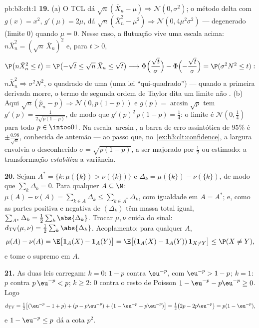 \begin{solution}{pb:b3:clt:1}
\textbf{19.} (a) O TCL dá $\sqrt n(\bar X_n - \mu)
\Rightarrow \mathcal N(0, \sigma^2)$; o método delta
com $g(x) = x^2$, $g'(\mu) = 2\mu$, dá $\sqrt n(\bar
X_n^2 - \mu^2) \Rightarrow \mathcal N(0, 4\mu^2\sigma^2)$
--- degenerado (limite $0$) quando $\mu = 0$. Nesse caso,
a flutuação vive uma escala acima: $n\bar X_n^2 =
(\sqrt n\,\bar X_n)^2$ e, para $t > 0$,
\[
\P\bigl(n\bar X_n^2 \leq t\bigr) = \P\bigl(-\sqrt t \leq
\sqrt n\,\bar X_n \leq \sqrt t\bigr) \longrightarrow
\Phi\Bigl(\frac{\sqrt t}\sigma\Bigr) -
\Phi\Bigl(-\frac{\sqrt t}\sigma\Bigr) = \P(\sigma^2N^2
\leq t) :
\]
$n\bar X_n^2 \Rightarrow \sigma^2N^2$, o quadrado de uma
 (uma lei ``qui-quadrado'') --- quando a primeira
derivada morre, o termo de segunda ordem de Taylor dita
um limite não . (b) Aqui $\sqrt n(\hat p_n - p)
\Rightarrow \mathcal N(0, p(1 - p))$ e $g(p) =
\arcsin\sqrt p$ tem $g'(p) = \frac1{2\sqrt{p(1 - p)}}$, de modo que
$g'(p)^2\,p(1 - p) = \frac14$: o limite é $\mathcal
N(0, \frac14)$ para todo $p \in \intoo01$. Na
escala $\arcsin$, a barra de erro assintótica de $95\%$ é $\pm
\frac{0.98}{\sqrt n}$, conhecida de antemão --- ao passo que, no~\cref{ex:b3:clt:confidence}, a largura envolvia o desconhecido
$\sigma = \sqrt{p(1-p)}$, a ser majorado por $\frac12$
ou estimado: a transformação \emph{estabiliza} a
variância.

\textbf{20.} Sejam $A^* = \{k : \mu(\{k\}) > \nu(\{k\})\}$
e $\Delta_k = \mu(\{k\}) - \nu(\{k\})$, de modo que
$\sum_k\Delta_k = 0$. Para qualquer $A \subseteq \N$: $\mu(A) -
\nu(A) = \sum_{k\in A}\Delta_k \leq \sum_{k\in
A^*}\Delta_k$, com igualdade em $A = A^*$; e, como as
partes positiva e negativa de $(\Delta_k)$ têm massa
total igual, $\sum_{A^*}\Delta_k =
\frac12\sum_k\abs{\Delta_k}$. Trocar $\mu, \nu$ cuida
do sinal: $d_{\mathrm{TV}}(\mu, \nu) =
\frac12\sum_k\abs{\Delta_k}$. Acoplamento: para qualquer $A$,
\[
\mu(A) - \nu(A) = \E\bigl[\mathbf 1_A(X) - \mathbf
1_A(Y)\bigr] = \E\bigl[(\mathbf 1_A(X) - \mathbf
1_A(Y))\,\mathbf 1_{X\neq Y}\bigr] \leq \P(X \neq Y),
\]
e tome o supremo em $A$.

\textbf{21.} As duas leis carregam: $k = 0$: $1 - p$ contra
$\eu^{-p}$, com $\eu^{-p} > 1 - p$; $k = 1$: $p$ contra
$p\,\eu^{-p} < p$; $k \geq 2$: $0$ contra o resto de Poisson
$1 - \eu^{-p} - p\eu^{-p} \geq 0$. Logo
\[
d_{\mathrm{TV}} = \tfrac12\bigl[(\eu^{-p} - 1 + p) + (p -
p\eu^{-p}) + (1 - \eu^{-p} - p\eu^{-p})\bigr] =
\tfrac12\bigl(2p - 2p\eu^{-p}\bigr) = p(1 - \eu^{-p}),
\]
e $1 - \eu^{-p} \leq p$ dá a cota $p^2$.


\end{solution}
